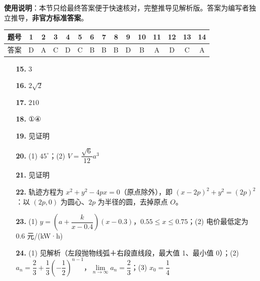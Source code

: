 
\begin{gknotice}
\textbf{使用说明}：本节只给最终答案便于快速核对，完整推导见解析版。答案为编写者独立推导，\textbf{非官方标准答案}。
\end{gknotice}

\begin{center}\begin{tabular}{ccccccccccccccc}
\toprule
题号 & 1 & 2 & 3 & 4 & 5 & 6 & 7 & 8 & 9 & 10 & 11 & 12 & 13 & 14 \\
\midrule
答案 & D & A & C & D & C & B & B & B & D & B & A & D & C & A \\
\bottomrule
\end{tabular}\end{center}

\begin{itemize}[leftmargin=2.6em]
  \item[\textbf{15.}] $3$
  \item[\textbf{16.}] $2\sqrt2$
  \item[\textbf{17.}] $210$
  \item[\textbf{18.}] ①④
\end{itemize}

\begin{itemize}[leftmargin=2.6em]
  \item[\textbf{19.}] 见证明
  \item[\textbf{20.}] (1) $45^\circ$；(2) $V=\dfrac{\sqrt6}{12}a^3$
  \item[\textbf{21.}] 见证明
  \item[\textbf{22.}] 轨迹方程为 $x^2+y^2-4px=0$（原点除外），即 $(x-2p)^2+y^2=(2p)^2$：以 $(2p,0)$ 为圆心、$2p$ 为半径的圆，去掉原点 $O$。
  \item[\textbf{23.}] (1) $y=\left(a+\dfrac{k}{x-0.4}\right)(x-0.3)$，$0.55\le x\le0.75$；(2) 电价最低定为 $0.6$ 元/(kW·h)
  \item[\textbf{24.}] (1) 见解析（左段抛物线弧＋右段直线段，最大值 1、最小值 0）；(2) $a_n=\dfrac23+\dfrac13\left(-\dfrac12\right)^{n-1}$，$\lim\limits_{n\to\infty}a_n=\dfrac23$；(3) $x_0=\dfrac14$
\end{itemize}
